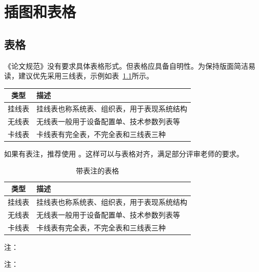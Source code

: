 
\chapter{插图和表格}

\section{表格}

《论文规范》没有要求具体表格形式。但表格应具备自明性。为保持版面简洁易读，建议优先采用三线表，示例如表~\ref{tab:exampletable}所示。

\begin{table}
  \centering
  \label{tab:exampletable}
  \begin{tabular}{cl}
    \toprule
    类型   & 描述                                       \\
    \midrule
    挂线表 & 挂线表也称系统表、组织表，用于表现系统结构 \\
    无线表 & 无线表一般用于设备配置单、技术参数列表等   \\
    卡线表 & 卡线表有完全表，不完全表和三线表三种       \\
    \bottomrule
  \end{tabular}
\end{table}

如果有表注，推荐使用 。这样可以与表格对齐，满足部分评审老师的要求。

\begin{table}
  \centering
  \begin{threeparttable}
    \caption{带表注的表格}
    \label{tab:tablewithnotes}
    \begin{tabular}{cl}
      \toprule
      类型   & 描述                                       \\
      \midrule
      挂线表\tnote{a} & 挂线表也称系统表、组织表，用于表现系统结构 \\
      无线表\tnote{b} & 无线表一般用于设备配置单、技术参数列表等   \\
      卡线表 & 卡线表有完全表，不完全表和三线表三种       \\
      \bottomrule
    \end{tabular}
    \begin{tablenotes}[flushleft]
      \item[a] 注：
      \item[b] 注：
    \end{tablenotes}
  \end{threeparttable}
\end{table}

